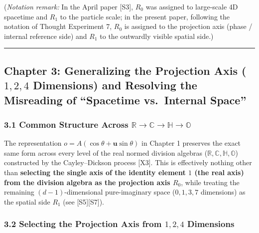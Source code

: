 \documentclass[
  a4paper,
]{article}
\begin{document}
(\emph{Notation remark:} In the April paper {[}S3{]}, \(R_0\) was
assigned to large-scale 4D spacetime and \(R_1\) to the particle scale;
in the present paper, following the notation of Thought Experiment 7,
\(R_0\) is assigned to the projection axis (phase / internal reference
side) and \(R_1\) to the outwardly visible spatial side.)

\begin{center}\rule{0.5\linewidth}{0.5pt}\end{center}

\subsection{\texorpdfstring{Chapter 3: Generalizing the Projection Axis
(\(1, 2, 4\) Dimensions) and Resolving the Misreading of ``Spacetime
vs.~Internal
Space''}{Chapter 3: Generalizing the Projection Axis (1, 2, 4 Dimensions) and Resolving the Misreading of ``Spacetime vs.~Internal Space''}}\label{chapter-3-generalizing-the-projection-axis-1-2-4-dimensions-and-resolving-the-misreading-of-spacetime-vs.-internal-space}

\subsubsection{\texorpdfstring{3.1 Common Structure Across
\(\mathbb{R} \to \mathbb{C} \to \mathbb{H} \to \mathbb{O}\)}{3.1 Common Structure Across \textbackslash mathbb\{R\} \textbackslash to \textbackslash mathbb\{C\} \textbackslash to \textbackslash mathbb\{H\} \textbackslash to \textbackslash mathbb\{O\}}}\label{common-structure-across-mathbbr-to-mathbbc-to-mathbbh-to-mathbbo}

The representation \(o = A(\cos\theta + \mathbf{u}\sin\theta)\) in
Chapter 1 preserves the exact same form across every level of the real
normed division algebras
(\(\mathbb{R}, \mathbb{C}, \mathbb{H}, \mathbb{O}\)) constructed by the
Cayley--Dickson process {[}X3{]}. This is effectively nothing other than
\textbf{selecting the single axis of the identity element \(1\) (the
real axis) from the division algebra as the projection axis \(R_0\)},
while treating the remaining \((d-1)\)-dimensional pure-imaginary space
(\(0, 1, 3, 7\) dimensions) as the spatial side \(R_1\) (see
{[}S5{]}{[}S7{]}).

\subsubsection{\texorpdfstring{3.2 Selecting the Projection Axis from
\(1, 2, 4\)
Dimensions}{3.2 Selecting the Projection Axis from 1, 2, 4 Dimensions}}\label{selecting-the-projection-axis-from-1-2-4-dimensions}
\end{document}
